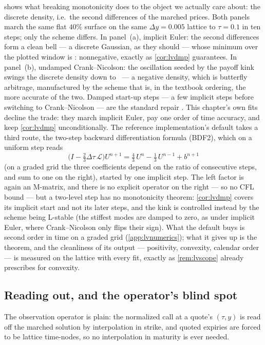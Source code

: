  shows what breaking monotonicity does to the
object we actually care about: the discrete density, i.e.\ the second
differences of the marched prices.  Both panels march the same flat
$40\%$ surface on the same $\Delta y=0.005$ lattice to $\tau=0.1$ in
ten steps; only the scheme differs.  In panel~(a), implicit Euler: the
second differences form a clean bell --- a discrete Gaussian, as they
should --- whose minimum over the plotted window is
\MacLvLatImplMinDens: nonnegative, exactly as \cref{cor:lvdmp}
guarantees.  In panel~(b), undamped Crank--Nicolson: the oscillation
seeded by the payoff kink swings the discrete density down to
\MacLvLatCnMinDens\ --- a negative density, which is butterfly
arbitrage, manufactured by the scheme that is, in the textbook
ordering, the more accurate of the two.  Damped start-up steps --- a
few implicit steps before switching to Crank--Nicolson --- are the
standard repair \citep{GilesCarter2006}.  This chapter's own fits
decline the trade: they march implicit Euler, pay one order of time
accuracy, and keep \cref{cor:lvdmp} unconditionally.  The reference
implementation's default takes a third route, the two-step backward
differentiation formula (BDF2), which on a uniform step reads
\[
\big(I-\tfrac{2}{3}\Delta\tau\,\mathcal L\big)U^{n+1}
=\tfrac{4}{3}\,U^{n}-\tfrac{1}{3}\,U^{n-1}+b^{n+1}
\]
(on a graded grid the three coefficients depend on the ratio of
consecutive steps, and sum to one on the right), started by one
implicit step.  The left factor is again an M-matrix,
and there is no explicit operator on the right --- so no CFL bound ---
but a two-level step has no monotonicity theorem: \cref{cor:lvdmp}
covers its implicit start and not its later steps, and the kink is
controlled instead by the scheme being L-stable (the stiffest modes are
damped to zero, as under implicit Euler, where Crank--Nicolson only
flips their sign).  What the default buys is second order in time on a
graded grid (\cref{app:lvnumerics}); what it gives up is the theorem,
and the cleanliness of its output --- positivity, convexity, calendar
order --- is measured on the lattice with every fit, exactly as
\cref{rem:lvscope} already prescribes for convexity.

\subsection{Reading out, and the operator's blind spot}

The observation operator is plain: the normalized call at a quote's
$(\tau,y)$ is read off the marched solution by interpolation in
strike, and quoted expiries are forced to be lattice time-nodes, so no
interpolation in maturity is ever needed.


